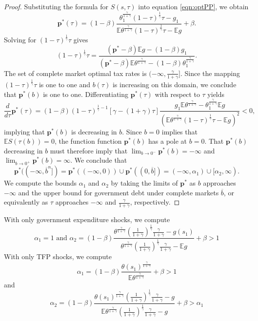 \documentclass[12pt]{article}
\newcommand{\EE}{\mathbb E}
\begin{document}
\begin{proof}
Substituting the formula for $S(s,\tau)$ into equation \eqref{eqn:optPP}, we obtain
\[
	\bm p^*(\tau) = (1-\beta)\frac{\theta_1^\frac\gamma{1+\gamma}(1-\tau)^\frac1\gamma\tau-g_1}{\EE\theta^\frac\gamma{1+\gamma}(1-\tau)^\frac1\gamma\tau - \EE g} + \beta .
\]  Solving for $(1-\tau)^\frac1\gamma\tau$ gives
\[
	(1-\tau)^\frac{1}{\gamma}\tau = \frac{(\bm p^*-\beta)\EE g-(1-\beta)g_1}{(\bm p^* - \beta)\EE\theta^\frac{\gamma}{1+\gamma}-(1-\beta)\theta_1^\frac{\gamma}{1+\gamma}} .
\]  The set of complete market optimal tax rates is $(-\infty,\frac\gamma{1+\gamma}]$.  Since the mapping  $(1-\tau)^\frac1\gamma\tau$ is one to one
 and $b(\tau)$ is increasing on this domain, we conclude that $\bm p^*(b)$ is one to one. Differentiating $\bm p^*(\tau)$ with respect to $\tau$  yields
\[
	\frac{d}{d\tau} \bm p^*(\tau) = (1-\beta)(1-\tau)^{\frac1\gamma-1}\left[\gamma-(1+\gamma)\tau\right]\frac{g_1\EE\theta^\frac{\gamma}{1+\gamma}-\theta_1^\frac\gamma{1+\gamma}\EE g }{(\EE\theta^\frac\gamma{1+\gamma}(1-\tau)^\frac1\gamma\tau-\EE g)^2} <0,
\] implying that $\bm p^*(b)$ is decreasing in $b$. Since  $b =0$ implies that $\EE S(\tau(b)) =0$, the function function $\bm p^*(b)$ has a pole at $b = 0$.  That $\bm p^*(b)$ decreasing in $b$ must therefore imply that $\lim_{b\rightarrow0^{-} } \bm p^*(b) = -\infty$ and $\lim_{b\rightarrow 0^+} \bm p^*(b) = \infty$.  We conclude that
\[
	\bm p^*((-\infty,\overline b^n]) = \bm p^*((-\infty,0))\cup \bm p^*((0,\overline b]) = (-\infty,\alpha_1)\cup[\alpha_2,\infty).
\] We compute the bounds $\alpha_1$ and $\alpha_2$ by taking the limits of $\bm p^*$ as $b$ approaches $-\infty$ and the upper bound for government
debt under complete markets $\overline b$, or equivalently as $\tau$ approaches $-\infty$ and $\frac\gamma{1+\gamma}$, respectively.
\end{proof}
 With only government expenditure shocks, we compute
		\[
			\alpha_1 = 1 \text{  and }  \alpha_2 = (1-\beta)\frac{\theta^\frac{\gamma}{1+\gamma}\left(\frac{1}{1+\gamma}\right)^\frac1\gamma\frac{\gamma}{1+\gamma}-g(s_1)}{\theta^\frac{\gamma}{1+\gamma}\left(\frac{1}{1+\gamma}\right)^\frac1\gamma\frac{\gamma}{1+\gamma}-\EE g} +\beta>1
		\]
		With only TFP shocks, we compute
		\[
			\alpha_1 = (1-\beta)\frac{\theta(s_1)^\frac{\gamma}{1+\gamma}}{\EE\theta^\frac{\gamma}{1+\gamma}}+\beta > 1
		\]and
		\[
		\alpha_2 = (1-\beta)\frac{\theta(s_1)^\frac{\gamma}{1+\gamma}\left(\frac{1}{1+\gamma}\right)^\frac1\gamma\frac{\gamma}{1+\gamma}-g}{\EE\theta^\frac{\gamma}{1+\gamma}\left(\frac{1}{1+\gamma}\right)^\frac1\gamma\frac{\gamma}{1+\gamma}-g}+\beta>\alpha_1
		\]
\end{document}
